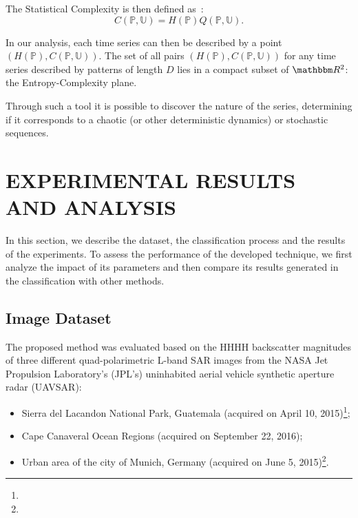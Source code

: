\documentclass[journal]{IEEEtran}
\begin{document}
The Statistical Complexity is then defined as~\cite{Lamberti2004}:
\begin{equation}
C(\mathbb{P}, \mathbb{U}) = H(\mathbb{P}) Q(\mathbb{P}, \mathbb{U}).
\end{equation}

In our analysis, each time series can then be described by a point $(H(\mathbb{P}), C(\mathbb{P}, \mathbb{U}))$.
The set of all pairs $(H(\mathbb{P}), C(\mathbb{P}, \mathbb{U}))$ for any time series described by patterns of length $D$ lies in a compact subset of $\mathbbm R^2$: the Entropy-Complexity plane. 

Through such a tool it is possible to discover the nature of the series, determining if it corresponds to a chaotic (or other deterministic dynamics) or stochastic sequences.

\section{EXPERIMENTAL RESULTS AND ANALYSIS}\label{Results}

In this section, we describe the dataset, the classification process and the results of the experiments.
To assess the performance of the developed technique, we first analyze the impact of its parameters and then compare its results generated in the classification with other methods.

\subsection{Image Dataset}

The proposed method was evaluated based on the HHHH backscatter magnitudes of three different quad-polarimetric L-band SAR images from the NASA Jet Propulsion Laboratory’s (JPL’s) uninhabited aerial vehicle synthetic aperture radar (UAVSAR):
\begin{itemize}
	\item Sierra del Lacandon National Park, Guatemala (acquired on April 10, 2015)\footnote{};
	\item Cape Canaveral Ocean Regions (acquired on September 22, 2016);
	\item Urban area of the city of Munich, Germany (acquired on June 5, 2015)\footnote{}.
\end{itemize}
\end{document}
